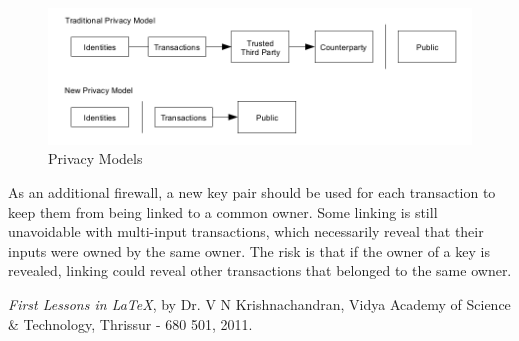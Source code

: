 \begin{figure}[ht!]
\centering
\includegraphics[trim = 0mm 0mm 0mm 0mm, width=120mm]{traditional_privacy_model}
\caption{Privacy Models}
\end{figure}

As an additional firewall, a new key pair should be used for each transaction to keep them from being linked to a common owner. Some linking is still unavoidable with multi-input transactions, which necessarily reveal that their inputs were owned by the same owner. The risk is that if the owner of a key is revealed, linking could reveal other transactions that belonged to the same owner.


%
%
%
%
\clearpage
{}
%
%
\begin{thebibliography}{99}
%
{\em First Lessons in \LaTeX}, by Dr. V N Krishnachandran, 
Vidya Academy of Science \& Technology, 
Thrissur - 680 501, 2011.
%
\end{thebibliography}
%
%

%
%

